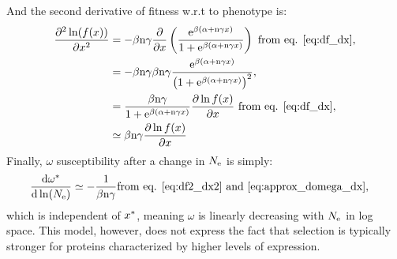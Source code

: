 \documentclass{article}
\begin{document}
And the second derivative of fitness w.r.t to phenotype is:
\begin{align}
\frac{\partial^2 \ln (f(x))}{\partial x^2} & = - \beta \text{n} \gamma \frac{\partial}{\partial x} \left( \frac{\mathrm{e}^{\beta(\alpha + \text{n} \gamma x)}}{1 + \mathrm{e}^{\beta(\alpha + \text{n} \gamma x)}} \right) \text{ from eq. \ref{eq:df_dx}}, \\
 & = - \beta \text{n} \gamma  \beta \text{n} \gamma \frac{\mathrm{e}^{\beta(\alpha + \text{n} \gamma x)}}{\left( 1 + \mathrm{e}^{\beta(\alpha + \text{n} \gamma x)}\right)^2}, \\
 & = \frac{\beta \text{n} \gamma}{1 + \mathrm{e}^{\beta(\alpha + \text{n} \gamma x)}} \frac{ \partial \ln f(x) }{\partial x} \text{ from eq. \ref{eq:df_dx}} \label{eq:df2_dx2}, \\
 & \simeq \beta \text{n} \gamma \frac{ \partial \ln f(x) }{\partial x} 
\end{align}
Finally, $\omega$ susceptibility after a change in $N_{\mathrm{e}}$ is simply:
\begin{align}
\frac{ \mathrm{d} \omega^{*}}{\mathrm{d} \ln (N_{\mathrm{e}})} & \simeq - \frac{1}{\beta \text{n} \gamma} \text{from eq. \ref{eq:df2_dx2} and \ref{eq:approx_domega_dx}},
\end{align}
which is independent of $x^{*}$, meaning $\omega$ is linearly decreasing with $N_{\mathrm{e}}$ in log space.
This model, however, does not express the fact that selection is typically stronger for proteins characterized by higher levels of expression. 
\end{document}
